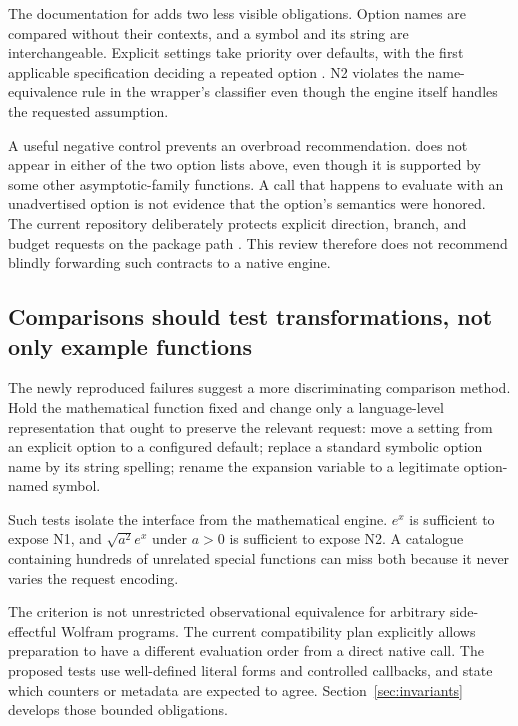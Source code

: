 \documentclass[11pt,a4paper]{article}
\newcommand{\code}[1]{\texttt{\detokenize{#1}}}
\begin{document}
The documentation for \code{OptionValue} adds two less visible obligations. Option names are compared without their contexts, and a symbol and its \code{SymbolName} string are interchangeable. Explicit settings take priority over defaults, with the first applicable specification deciding a repeated option \cite{optiondoc}. N2 violates the name-equivalence rule in the wrapper's classifier even though the engine itself handles the requested assumption.

A useful negative control prevents an overbroad recommendation. \code{Direction} does not appear in either of the two option lists above, even though it is supported by some other asymptotic-family functions. A call that happens to evaluate with an unadvertised option is not evidence that the option's semantics were honored. The current repository deliberately protects explicit direction, branch, and budget requests on the package path \cite{nativeplan}. This review therefore does not recommend blindly forwarding such contracts to a native engine.

\subsection{Comparisons should test transformations, not only example functions}

The newly reproduced failures suggest a more discriminating comparison method. Hold the mathematical function fixed and change only a language-level representation that ought to preserve the relevant request: move a setting from an explicit option to a configured default; replace a standard symbolic option name by its string spelling; rename the expansion variable to a legitimate option-named symbol.

Such tests isolate the interface from the mathematical engine. \(e^x\) is sufficient to expose N1, and \(\sqrt{a^2}e^x\) under \(a>0\) is sufficient to expose N2. A catalogue containing hundreds of unrelated special functions can miss both because it never varies the request encoding.

The criterion is not unrestricted observational equivalence for arbitrary side-effectful Wolfram programs. The current compatibility plan explicitly allows preparation to have a different evaluation order from a direct native call. The proposed tests use well-defined literal forms and controlled callbacks, and state which counters or metadata are expected to agree. Section~\ref{sec:invariants} develops those bounded obligations.
\end{document}
